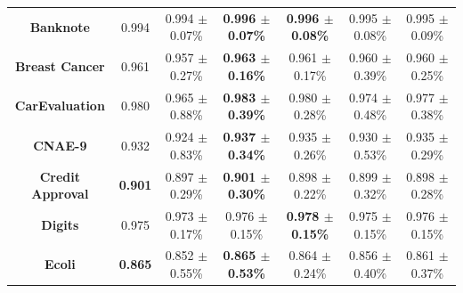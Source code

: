 \documentclass[iicol]{sn-jnl}
\theoremstyle{thmstyleone}%
\theoremstyle{thmstyletwo}%
\theoremstyle{thmstylethree}%
\begin{document}
\begin{table}
{\begin{tabular}{ccccccc}
\textbf{Banknote}               & 0.994                                 & 0.994 $\pm$ 0.07\%                                 & \textbf{0.996 $\pm$ 0.07\%}                        & {\color[HTML]{FE0000} \textbf{0.996 $\pm$ 0.08\%}} & 0.995 $\pm$ 0.08\%                                 & 0.995 $\pm$ 0.09\%                                 \\
\textbf{Breast Cancer}          & 0.961                                 & 0.957 $\pm$ 0.27\%                                 & {\color[HTML]{FE0000} \textbf{0.963 $\pm$ 0.16\%}} & 0.961 $\pm$ 0.17\%                                 & 0.960 $\pm$ 0.39\%                                 & 0.960 $\pm$ 0.25\%                                 \\
\textbf{CarEvaluation}          & {\color[HTML]{FE0000} 0.980}          & 0.965 $\pm$ 0.88\%                                 & \textbf{0.983 $\pm$ 0.39\%}                        & 0.980 $\pm$ 0.28\%                                 & 0.974 $\pm$ 0.48\%                                 & 0.977 $\pm$ 0.38\%                                 \\
\textbf{CNAE-9}                 & 0.932                                 & 0.924 $\pm$ 0.83\%                                 & {\color[HTML]{FE0000} \textbf{0.937 $\pm$ 0.34\%}} & 0.935 $\pm$ 0.26\%                                 & 0.930 $\pm$ 0.53\%                                 & 0.935 $\pm$ 0.29\%                                 \\
\textbf{Credit   Approval}      & {\color[HTML]{FE0000} \textbf{0.901}} & 0.897 $\pm$ 0.29\%                                 & \textbf{0.901 $\pm$ 0.30\%}                        & 0.898 $\pm$ 0.22\%                                 & 0.899 $\pm$ 0.32\%                                 & 0.898 $\pm$ 0.28\%                                 \\
\textbf{Digits}                 & 0.975                                 & 0.973 $\pm$ 0.17\%                                 & 0.976 $\pm$ 0.15\%                                 & {\color[HTML]{FE0000} \textbf{0.978 $\pm$ 0.15\%}} & 0.975 $\pm$ 0.15\%                                 & 0.976 $\pm$ 0.15\%                                 \\
\textbf{Ecoli}                  & {\color[HTML]{FE0000} \textbf{0.865}} & 0.852 $\pm$ 0.55\%                                 & \textbf{0.865 $\pm$ 0.53\%}                        & 0.864 $\pm$ 0.24\%                                 & 0.856 $\pm$ 0.40\%                                 & 0.861 $\pm$ 0.37\%                                 \\

\end{tabular}}
\end{table}
\end{document}
